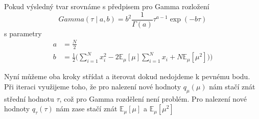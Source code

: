 \documentclass[11pt]{article}
\begin{document}
Pokud výsledný tvar srovnáme s předpisem pro Gamma rozložení
\begin{equation}
Gamma(\tau \mid a, b) = b^2 \frac{1}{\Gamma(a)} \tau^{a-1} \exp(-b\tau)
\end{equation}
s parametry
\begin{align}
a &= \frac{N}{2}
\\
b &= \frac{1}{2} \Big(
    \sum_{i=1}^N x_i^2 - 2 \mathbb{E}_\mu[\mu] \sum_{i=1}^N x_i + N
    \mathbb{E}_\mu[\mu^2])
	\Big)
\end{align}

Nyní můžeme oba kroky střídat a iterovat dokud nedojdeme k pevnému bodu. Při
iteraci využijeme toho, že pro nalezení nové hodnoty $q_\mu(\mu)$ nám stačí
znát střední hodnotu $\tau$, což pro Gamma rozdělení není problém. Pro nalezení
nové hodnoty $q_\tau(\tau)$ nám zase stačí znát $\mathbb{E}_\mu[\mu]$ a
$\mathbb{E}_\mu[\mu^2]$
\end{document}
